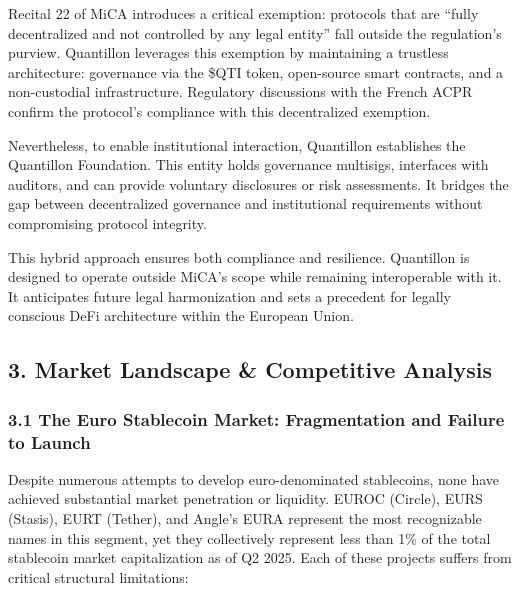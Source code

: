 Recital 22 of MiCA introduces a critical exemption: protocols that are
``fully decentralized and not controlled by any legal entity'' fall
outside the regulation's purview. Quantillon leverages this exemption by
maintaining a trustless architecture: governance via the \$QTI token,
open-source smart contracts, and a non-custodial infrastructure.
Regulatory discussions with the French ACPR confirm the protocol's
compliance with this decentralized exemption.

Nevertheless, to enable institutional interaction, Quantillon
establishes the Quantillon Foundation. This entity holds governance
multisigs, interfaces with auditors, and can provide voluntary
disclosures or risk assessments. It bridges the gap between
decentralized governance and institutional requirements without
compromising protocol integrity.

This hybrid approach ensures both compliance and resilience. Quantillon
is designed to operate outside MiCA's scope while remaining
interoperable with it. It anticipates future legal harmonization and
sets a precedent for legally conscious DeFi architecture within the
European Union.

\hypertarget{market-landscape-competitive-analysis}{%
\subsection{3. Market Landscape \& Competitive
Analysis}\label{market-landscape-competitive-analysis}}

\hypertarget{the-euro-stablecoin-market-fragmentation-and-failure-to-launch}{%
\subsubsection{3.1 The Euro Stablecoin Market: Fragmentation and Failure
to
Launch}\label{the-euro-stablecoin-market-fragmentation-and-failure-to-launch}}

Despite numerous attempts to develop euro-denominated stablecoins, none
have achieved substantial market penetration or liquidity. EUROC
(Circle), EURS (Stasis), EURT (Tether), and Angle's EURA represent the
most recognizable names in this segment, yet they collectively represent
less than 1\% of the total stablecoin market capitalization as of Q2
2025. Each of these projects suffers from critical structural
limitations:

